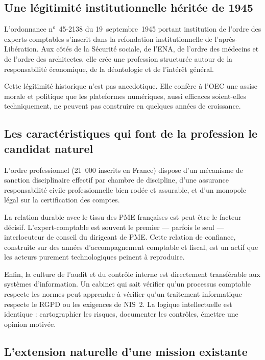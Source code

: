 \documentclass[12pt,a4paper]{article}
\begin{document}
\subsection{Une légitimité institutionnelle héritée de 1945}

L'ordonnance n°~45-2138 du 19~septembre~1945 portant institution de l'ordre des experts-comptables s'inscrit dans la refondation institutionnelle de l'après-Libération. Aux côtés de la Sécurité sociale, de l'ENA, de l'ordre des médecins et de l'ordre des architectes, elle crée une profession structurée autour de la responsabilité économique, de la déontologie et de l'intérêt général.

Cette légitimité historique n'est pas anecdotique. Elle confère à l'OEC une assise morale et politique que les plateformes numériques, aussi efficaces soient-elles techniquement, ne peuvent pas construire en quelques années de croissance.

\subsection{Les caractéristiques qui font de la profession le candidat naturel}

L'ordre professionnel (21~000 inscrits en France) dispose d'un mécanisme de sanction disciplinaire effectif par chambre de discipline, d'une assurance responsabilité civile professionnelle bien rodée et assurable, et d'un monopole légal sur la certification des comptes.

La relation durable avec le tissu des PME françaises est peut-être le facteur décisif. L'expert-comptable est souvent le premier --- parfois le seul --- interlocuteur de conseil du dirigeant de PME. Cette relation de confiance, construite sur des années d'accompagnement comptable et fiscal, est un actif que les acteurs purement technologiques peinent à reproduire.

Enfin, la culture de l'audit et du contrôle interne est directement transférable aux systèmes d'information. Un cabinet qui sait vérifier qu'un processus comptable respecte les normes peut apprendre à vérifier qu'un traitement informatique respecte le RGPD ou les exigences de NIS~2. La logique intellectuelle est identique : cartographier les risques, documenter les contrôles, émettre une opinion motivée.

\subsection{L'extension naturelle d'une mission existante}
\end{document}
